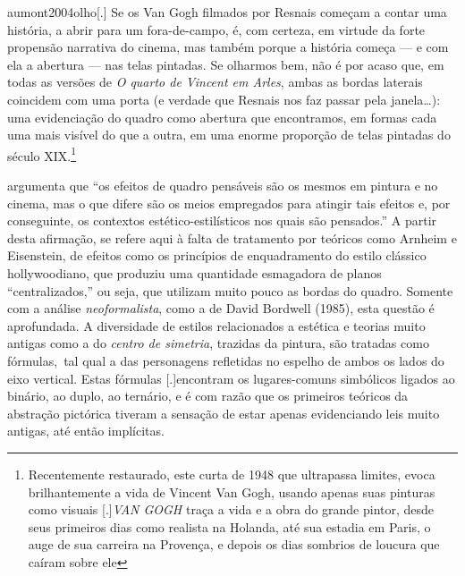 \begin{displaycquote}[124]{aumont2004olho}[.]
	Se os Van Gogh filmados por Resnais começam a contar uma história, a
	abrir para um fora-de-campo, é, com certeza, em virtude da forte
	propensão narrativa do cinema, mas também porque a história começa --- e
	com ela a abertura --- nas telas pintadas. Se olharmos bem, não é por
	acaso que, em todas as versões de \emph{O quarto de Vincent em Arles},
	ambas as bordas laterais coincidem com uma porta (e verdade que Resnais
	nos faz passar pela janela\ldots): uma evidenciação do quadro como abertura
	que encontramos, em formas cada uma mais visível do que a outra, em uma
	enorme proporção de telas pintadas do século XIX\@.\footnote{Recentemente
		restaurado, este curta de 1948 que ultrapassa limites, evoca
		brilhantemente a vida de Vincent Van Gogh, usando apenas suas pinturas
		como visuais [.]{\emph{VAN GOGH} traça a vida e a obra do grande
			pintor, desde seus primeiros dias como realista na Holanda, até sua
			estadia em Paris, o auge de sua carreira na Provença, e depois os dias
			sombrios de loucura que caíram sobre ele}}
\end{displaycquote}

\textcite[124]{aumont2004olho} argumenta que \enquote{os efeitos de quadro pensáveis são
	os mesmos em pintura e no cinema, mas o que difere são os meios
	empregados para atingir tais efeitos e, por conseguinte, os contextos
	estético-estilísticos nos quais são pensados.}  A partir desta
afirmação, se refere aqui à falta de tratamento por teóricos como
Arnheim e Eisenstein, de efeitos como os princípios de enquadramento do
estilo clássico hollywoodiano, que produziu uma quantidade esmagadora
de planos \enquote{centralizados,} ou seja, que utilizam muito pouco as
bordas do quadro. Somente com a análise \emph{neoformalista}, como a de
David Bordwell (1985), esta questão é aprofundada. A diversidade de
estilos relacionados a estética e teorias muito antigas como a do
\emph{centro de simetria}, trazidas da pintura, são tratadas como
fórmulas,~tal qual a das personagens refletidas no espelho de ambos os
lados do eixo vertical. Estas fórmulas
[.]{encontram os lugares-comuns
	simbólicos ligados ao binário, ao duplo, ao ternário, e é com razão que
	os primeiros teóricos da abstração pictórica tiveram a sensação de
	estar apenas evidenciando leis muito antigas, até então implícitas}.%

